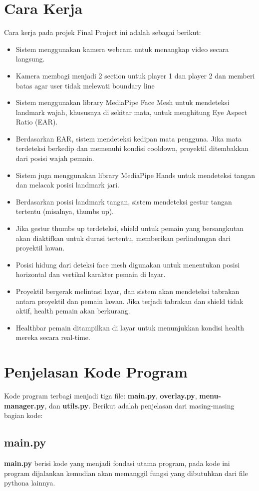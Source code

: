 \documentclass[11pt,a4paper]{article}
\begin{document}
\section{Cara Kerja}
Cara kerja pada projek Final Project ini adalah sebagai berikut:
\begin{itemize}
    \item Sistem menggunakan kamera webcam untuk menangkap video secara langsung.
    \item Kamera membagi menjadi 2 section untuk player 1 dan player 2 dan memberi batas agar user tidak melewati boundary line
    \item Sistem menggunakan library MediaPipe Face Mesh untuk mendeteksi landmark wajah, khususnya di sekitar mata, untuk menghitung Eye Aspect Ratio (EAR).
    \item Berdasarkan EAR, sistem mendeteksi kedipan mata pengguna. Jika mata terdeteksi berkedip dan memenuhi kondisi cooldown, proyektil ditembakkan dari posisi wajah pemain.
    \item Sistem juga menggunakan library MediaPipe Hands untuk mendeteksi tangan dan melacak posisi landmark jari.
    \item Berdasarkan posisi landmark tangan, sistem mendeteksi gestur tangan tertentu (misalnya, thumbs up).
    \item Jika gestur thumbs up terdeteksi, shield untuk pemain yang bersangkutan akan diaktifkan untuk durasi tertentu, memberikan perlindungan dari proyektil lawan.
    \item Posisi hidung dari deteksi face mesh digunakan untuk menentukan posisi horizontal dan vertikal karakter pemain di layar.
    \item Proyektil bergerak melintasi layar, dan sistem akan mendeteksi tabrakan antara proyektil dan pemain lawan. Jika terjadi tabrakan dan shield tidak aktif, health pemain akan berkurang.
    \item Healthbar pemain ditampilkan di layar untuk menunjukkan kondisi health mereka secara real-time.
\end{itemize}

\section{Penjelasan Kode Program}
Kode program terbagi menjadi tiga file: \textbf{main.py}, \textbf{overlay.py}, \textbf{menu-manager.py}, dan \textbf{utils.py}. Berikut adalah penjelasan dari masing-masing bagian kode:
\subsection{main.py}
\textbf{main.py} berisi kode yang menjadi fondasi utama program, pada kode ini program dijalankan kemudian akan memanggil fungsi yang dibutuhkan dari file pythona lainnya.
\end{document}
